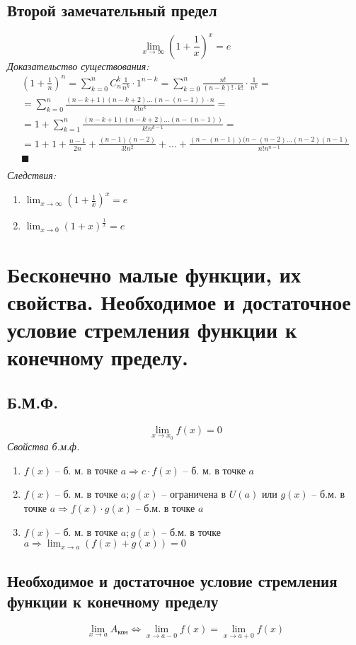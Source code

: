 \documentclass[12pt, fleqn]{article}
\begin{document}
\subsection{Второй замечательный предел}
$$\lim_{x\to\infty}\left(1+\frac{1}{x}\right)^x=e$$
\textit{Доказательство существования:}
\begin{multline*}
	\left(1+\frac{1}{n}\right)^n=\sum_{k=0}^{n}C_n^k \frac{1}{n^k}\cdot 1^{n-k}=\sum_{k=0}^{n}\frac{n!}{\left(n-k\right)!\cdot k!}\cdot \frac{1}{n^k}=\\
	=\sum_{k=0}^{n}\frac{(n-k+1)(n-k+2)\dots(n-(n-1))\cdot n}{k!n^{k}}=\\
	=1+\sum_{k=1}^{n}\frac{(n-k+1)(n-k+2)\dots(n-(n-1))}{k!n^{k-1}}=\\
	=1+1+\frac{n-1}{2n}+\frac{(n-1)(n-2)}{3!n^2}+\dots+\frac{(n-(n-1))(n-(n-2)\dots(n-2)(n-1)}{n!n^{n-1}}\\
	\blacksquare\\
\end{multline*}
\textit{Следствия:}
\begin{enumerate}
	\item $\lim_{x\to\infty}\left(1+\frac{1}{x}\right)^x=e$
	\item $\lim_{x\to 0}\left(1+x\right)^{\frac{1}{x}}=e$
\end{enumerate}
\section{Бесконечно малые функции, их свойства. Необходимое и достаточное условие стремления функции к конечному пределу.}
\subsection{Б.М.Ф.}
$$\lim_{x\to x_0}f(x)=0$$
\textit{Свойства б.м.ф.}
\begin{enumerate}
	\item $f(x)$ -- б. м. в точке $a \Rightarrow c\cdot f(x)$ -- б. м. в точке $a$
	\item $f(x)$ -- б. м. в точке $a; g(x)$ -- ограничена в $U(a)$ или $g(x)$ -- б.м. в точке $a \Rightarrow f(x)\cdot g(x)$ -- б.м. в точке $a$
	\item $f(x)$ -- б. м. в точке $a; g(x)$ -- б.м. в точке $a \Rightarrow \lim_{x\to a}\left(f(x)+g(x)\right)=0$
\end{enumerate}
\subsection{Необходимое и достаточное условие стремления функции к конечному пределу}
$$\lim_{x \to a}A_{\text{кон}} \Leftrightarrow \lim_{x\to a-0} f(x)=\lim_{x\to a+0}f(x)$$
\end{document}
